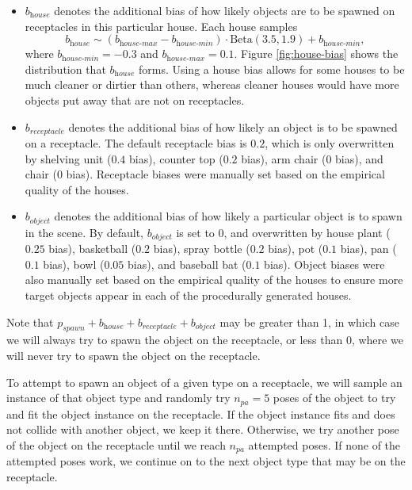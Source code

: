 \begin{itemize}[leftmargin=0.25in]
    \item $b_{\textit{house}}$ denotes the additional bias of how likely objects are to be spawned on receptacles in this particular house. Each house samples
    \begin{equation}
        b_{\textit{house}}\sim (b_{\textit{house-max}} - b_{\textit{house-min}}) \cdot \text{Beta}(3.5, 1.9) + b_{\textit{house-min}},
    \end{equation}
    where $b_{\textit{house-min}} = - 0.3$ and $b_{\textit{house-max}}=0.1$. Figure \ref{fig:house-bias} shows the distribution that $b_{\textit{house}}$ forms. Using a house bias allows for some houses to be much cleaner or dirtier than others, whereas cleaner houses would have more objects put away that are not on receptacles. 
    \item $b_{\textit{receptacle}}$ denotes the additional bias of how likely an object is to be spawned on a receptacle. The default receptacle bias is $0.2$, which is only overwritten by shelving unit ($0.4$ bias), counter top ($0.2$ bias), arm chair ($0$ bias), and chair ($0$ bias). Receptacle biases were manually set based on the empirical quality of the houses.
    \item $b_{\textit{object}}$ denotes the additional bias of how likely a particular object is to spawn in the scene. By default, $b_{\textit{object}}$ is set to $0$, and overwritten by house plant ($0.25$ bias), basketball ($0.2$ bias), spray bottle ($0.2$ bias), pot ($0.1$ bias), pan ($0.1$ bias), bowl ($0.05$ bias), and baseball bat ($0.1$ bias). Object biases were also manually set based on the empirical quality of the houses to ensure more target objects appear in each of the procedurally generated houses.
\end{itemize}

Note that $p_{\textit{spawn}} + b_{\textit{house}} + b_{\textit{receptacle}} + b_{\textit{object}}$ may be greater than 1, in which case we will always try to spawn the object on the receptacle, or less than 0, where we will never try to spawn the object on the receptacle.

To attempt to spawn an object of a given type on a receptacle, we will sample an instance of that object type and randomly try $n_{\textit{pa}}=5$ poses of the object to try and fit the object instance on the receptacle. If the object instance fits and does not collide with another object, we keep it there. Otherwise, we try another pose of the object on the receptacle until we reach $n_{\textit{pa}}$ attempted poses. If none of the attempted poses work, we continue on to the next object type that may be on the receptacle.

